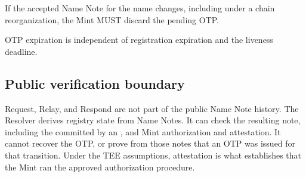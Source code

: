 If the accepted Name Note for the name changes, including under a chain reorganization, the Mint MUST discard the pending OTP.

OTP expiration is independent of registration expiration and the liveness deadline.

\subsection{Public verification boundary}

Request, Relay, and Respond are not part of the public Name Note history. The Resolver derives registry state from Name Notes. It can check the resulting note, including the  committed by an , and Mint authorization and attestation. It cannot recover the OTP, or prove from those notes that an OTP was issued for that transition.
Under the TEE assumptions, attestation is what establishes that the Mint ran the approved authorization procedure.
